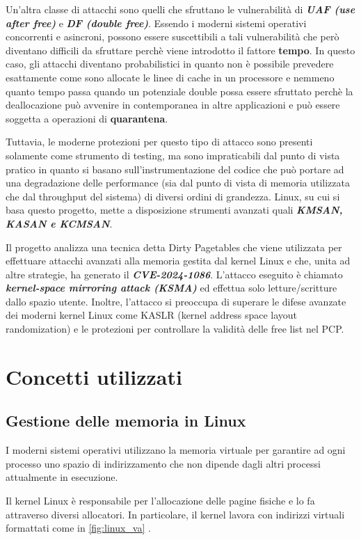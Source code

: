 \documentclass{article}
\begin{document}
Un'altra classe di attacchi sono quelli che sfruttano le vulnerabilità di \textbf{\textit{UAF (use after free)}} e 
\textbf{\textit{DF (double free)}}. Essendo i moderni sistemi operativi
concorrenti e asincroni, possono essere suscettibili a tali vulnerabilità che però diventano 
difficili da sfruttare perchè viene introdotto il fattore \textbf{tempo}. In questo caso, 
gli attacchi diventano probabilistici in quanto non è possibile prevedere esattamente come 
sono allocate le linee di cache in un processore e nemmeno quanto tempo passa quando un
potenziale double possa essere sfruttato perchè la deallocazione può avvenire in 
contemporanea in altre applicazioni e può essere soggetta a operazioni di \textbf{quarantena}. 

Tuttavia, le moderne protezioni per questo tipo di attacco sono presenti solamente come strumento 
di testing, ma sono impraticabili dal punto di vista pratico in quanto si basano sull'instrumentazione 
del codice che può portare ad una degradazione delle performance (sia dal punto di vista 
di memoria utilizzata che dal throughput del sistema) di diversi ordini di grandezza. 
Linux, su cui si basa questo progetto, mette a disposizione strumenti avanzati quali 
\textbf{\textit{KMSAN, KASAN e KCMSAN}}. 

Il progetto analizza una tecnica detta Dirty Pagetables che viene utilizzata per effettuare 
attacchi avanzati alla memoria gestita dal kernel Linux e che, unita ad altre strategie, ha 
generato il \textbf{\textit{CVE-2024-1086}}. L'attacco eseguito è chiamato 
\textbf{\textit{kernel-space mirroring attack (KSMA)}} ed effettua solo letture/scritture 
dallo spazio utente. Inoltre, l'attacco si preoccupa di superare le difese avanzate dei 
moderni kernel Linux come KASLR (kernel address space layout randomization) e le protezioni per 
controllare la validità delle free list nel PCP.

\clearpage
\section{Concetti utilizzati}
\subsection{Gestione delle memoria in Linux}
I moderni sistemi operativi utilizzano la memoria virtuale per garantire ad ogni processo 
uno spazio di indirizzamento che non dipende dagli altri processi attualmente in esecuzione. 

Il kernel Linux è responsabile per l'allocazione delle pagine fisiche e lo fa attraverso 
diversi allocatori. In particolare, il kernel lavora con indirizzi virtuali formattati come 
in \cref{fig:linux_va} \cite{LinuxDocs}.
\end{document}
